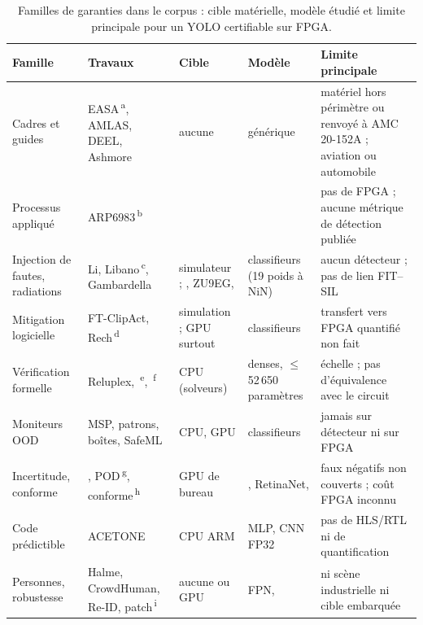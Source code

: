 \begin{table}[!htbp]
\centering\footnotesize
\caption{Familles de garanties dans le corpus : cible matérielle, modèle étudié et limite
principale pour un YOLO certifiable sur FPGA.}
\label{tab:surete}
\begin{tabularx}{\textwidth}{@{}P{2.5cm}P{3cm}P{2.2cm}P{2.3cm}L@{}}
\toprule
Famille & Travaux & Cible & Modèle & Limite principale \\
\midrule
Cadres et guides & EASA\,\textsuperscript{a}, AMLAS, DEEL, Ashmore & aucune & générique & matériel hors périmètre ou renvoyé à AMC 20-152A ; aviation ou automobile \\
Processus appliqué & ARP6983\,\textsuperscript{b} &  &  & pas de FPGA ; aucune métrique de détection publiée \\
Injection de fautes, radiations & Li, Libano\,\textsuperscript{c}, Gambardella & simulateur ; , ZU9EG,  & classifieurs (19 poids à NiN) & aucun détecteur ; pas de lien FIT--SIL \\
Mitigation logicielle & FT-ClipAct, Rech\,\textsuperscript{d} & simulation ; GPU surtout & classifieurs & transfert vers FPGA quantifié non fait \\
Vérification formelle & Reluplex, \,\textsuperscript{e}, \,\textsuperscript{f} & CPU (solveurs) & denses, $\leq$ 52\,650 paramètres & échelle ; pas d'équivalence avec le circuit \\
Moniteurs OOD & MSP, patrons, boîtes, SafeML & CPU, GPU & classifieurs & jamais sur détecteur ni sur FPGA \\
Incertitude, conforme & , POD\,\textsuperscript{g}, conforme\,\textsuperscript{h} & GPU de bureau & , RetinaNet,  & faux négatifs non couverts ; coût FPGA inconnu \\
Code prédictible & ACETONE & CPU ARM & MLP, CNN FP32 & pas de HLS/RTL ni de quantification \\
Personnes, robustesse & Halme, CrowdHuman, Re-ID, patch\,\textsuperscript{i} & aucune ou GPU & FPN,  & ni scène industrielle ni cible embarquée \\
\bottomrule
\end{tabularx}


\end{table}
